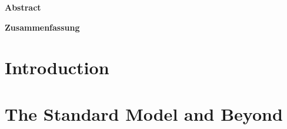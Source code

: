 \documentclass[12pt,USenglish,a4]{book}
\begin{document}
\begin{titlepage}

\end{titlepage}

\newpage\thispagestyle{empty}\mbox{}
\newpage\thispagestyle{empty}\mbox{}

\vspace*{\fill}
\begin{center}
\large
{\color{Black}\textbf{Abstract}}
\end{center}

\vspace*{\fill}

\newpage\thispagestyle{empty}\mbox{}
\newpage\thispagestyle{empty}\mbox{}

\vspace*{\fill}
\begin{center}
\large
{\color{Black}\textbf{Zusammenfassung}}
\end{center}

\vspace*{\fill}

\newpage\thispagestyle{empty}\mbox{}

\tableofcontents


\chapter*{Introduction}
\label{ch:Introduction}


\chapter{The Standard Model and Beyond} 
\label{ch:theory}
\vspace*{\fill}\newpage


% 


\end{document}
